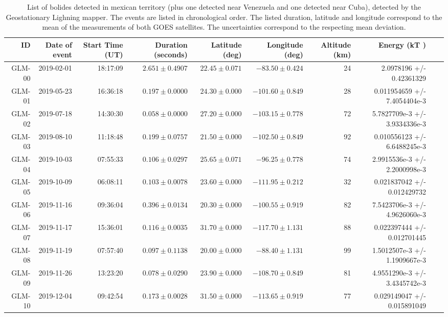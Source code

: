 \begin{table}
  \centering
  \footnotesize
  \caption{List of bolides detected in mexican territory (plus one detected near Venezuela and one detected near Cuba), detected by the Geostationary Lighning mapper. The events are listed in chronological order. The listed duration, latitude and longitude correspond to the mean of the measurements of both GOES satellites. The uncertainties correspond to the respecting mean deviation.}
\label{tab:table-meteors}
\begin{tabular}{rrrrrrrrrr}
\hline
ID & Date of event  & Start Time (UT)  & Duration (seconds) & Latitude (deg) & Longitude (deg)& Altitude (km) & Energy (kT )\\\hline
GLM-00 & 2019-02-01 & 18:17:09 & $2.651\pm 0.4907$ & $22.45 \pm 0.071$ & $-83.50  \pm  0.424$ & 24           & 2.0978196 +/- 0.42361329      \\         
GLM-01 & 2019-05-23 & 16:36:18 & $0.197\pm 0.0000$ & $24.30 \pm 0.000$ & $-101.60 \pm  0.849$ & 28           & 0.011954659 +/- 7.4054404e-3  \\
GLM-02 & 2019-07-18 & 14:30:30 & $0.058\pm 0.0000$ & $27.20 \pm 0.000$ & $-103.15 \pm  0.778$ & 72           & 5.7827709e-3 +/- 3.9334336e-3 \\
GLM-03 & 2019-08-10 & 11:18:48 & $0.199\pm 0.0757$ & $21.50 \pm 0.000$ & $-102.50  \pm 0.849$ & 92           & 0.010556123 +/- 6.6488245e-3  \\
GLM-04 & 2019-10-03 & 07:55:33 & $0.106\pm 0.0297$ & $25.65 \pm 0.071$ & $-96.25 \pm   0.778$ & 74           & 2.9915536e-3 +/- 2.2000998e-3 \\
GLM-05 & 2019-10-09 & 06:08:11 & $0.103\pm 0.0078$ & $23.60 \pm 0.000$ & $-111.95 \pm  0.212$ & 32           & 0.021837042 +/- 0.012429732   \\
GLM-06 & 2019-11-16 & 09:36:04 & $0.396\pm 0.0134$ & $20.30 \pm 0.000$ & $-100.55 \pm  0.919$ & 82           & 7.5423706e-3 +/- 4.9626060e-3 \\
GLM-07 & 2019-11-17 & 15:36:01 & $0.116\pm 0.0035$ & $31.70 \pm 0.000$ & $-117.70 \pm  1.131$ & 88           & 0.022397444 +/- 0.012701445   \\
GLM-08 & 2019-11-19 & 07:57:40 & $0.097\pm 0.1138$ & $20.00 \pm 0.000$ & $-88.40 \pm   1.131$ & 99           & 1.5012507e-3 +/- 1.1909667e-3 \\
GLM-09 & 2019-11-26 & 13:23:20 & $0.078\pm 0.0290$ & $23.90 \pm 0.000$ & $-108.70 \pm  0.849$ & 81           & 4.9551290e-3 +/- 3.4345742e-3 \\
GLM-10 & 2019-12-04 & 09:42:54 & $0.173\pm 0.0028$ & $31.50 \pm 0.000$ & $-113.65 \pm  0.919$ & 77           & 0.029149047 +/- 0.015891049   \\

\end{tabular}
\end{table}
